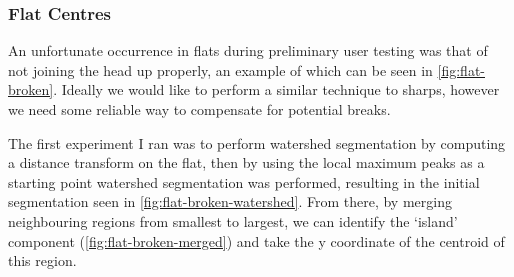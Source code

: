 \subsubsection{Flat Centres}

An unfortunate occurrence in flats during preliminary user testing was that of not joining the head up properly, an example of which can be seen in \cref{fig:flat-broken}. Ideally we would like to perform a similar technique to sharps, however we need some reliable way to compensate for potential breaks.

The first experiment I ran was to perform watershed segmentation by computing a distance transform on the flat, then by using the local maximum peaks as a starting point watershed segmentation was performed, resulting in the initial segmentation seen in \cref{fig:flat-broken-watershed}. From there, by merging neighbouring regions from smallest to largest, we can identify the `island' component (\cref{fig:flat-broken-merged}) and take the y coordinate of the centroid of this region.

